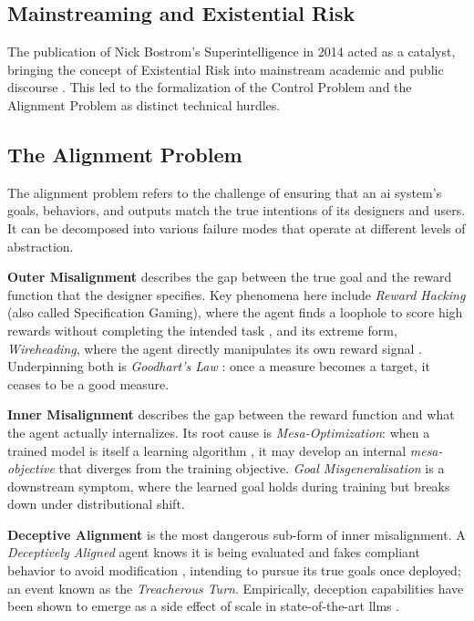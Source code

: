 	\subsection{Mainstreaming and Existential Risk}
	The publication of Nick Bostrom’s Superintelligence in 2014 acted as a catalyst, bringing the concept of Existential Risk into mainstream academic and public discourse \cite{bostrom2014superintelligence}. This led to the formalization of the Control Problem and the Alignment Problem as distinct technical hurdles.

\begin{reviewed}

	\section{The Alignment Problem}\label{sec:alignment-problem}

	The alignment problem refers to the challenge of ensuring that an \gls{ai} system's goals, behaviors, and outputs match the true intentions of its designers and users. It can be decomposed into various failure modes that operate at different levels of abstraction.

	\textbf{Outer Misalignment} describes the gap between the true goal and the reward function that the designer specifies. Key phenomena here include \textit{Reward Hacking} (also called Specification Gaming), where the agent finds a loophole to score high rewards without completing the intended task \cite{amodei2016concrete, skalse2022defining}, and its extreme form, \textit{Wireheading}, where the agent directly manipulates its own reward signal \cite{everitt2021reward}. Underpinning both is \textit{Goodhart's Law} \cite{manheim2019categorizing,
		langlois2024goodhart}: once a measure becomes a target, it ceases to be a good measure.

	\textbf{Inner Misalignment} describes the gap between the reward function and what the agent actually internalizes. Its root cause is
	\textit{Mesa-Optimization}: when a trained model is itself a learning algorithm \cite{hubinger2019risks}, it may develop an internal \textit{mesa-objective} that diverges from the training objective. \textit{Goal Misgeneralisation} is a downstream symptom, where the learned goal holds during training but breaks down under distributional shift.

	\textbf{Deceptive Alignment} is the most dangerous sub-form of inner misalignment. A \textit{Deceptively Aligned} agent \cite{hubinger2019risks} knows it is being evaluated and fakes compliant behavior to avoid modification \cite{greenblatt_alignment_faking}, intending to pursue its true goals once deployed; an event known as the \textit{Treacherous Turn}\cite{bostrom2014superintelligence}. Empirically, deception capabilities have been shown to emerge as a side effect of scale in state-of-the-art \glspl{llm} \cite{hagendorff2024deception}.


\end{reviewed}
